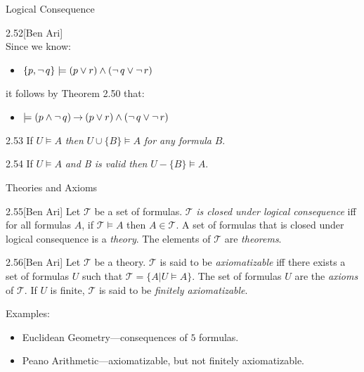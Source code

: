 \begin{wideslide}[bm=,toc=]{Logical Consequence}
\begin{ex}{2.52}[Ben Ari]
~\\Since we know:
\begin{itemize}
\item $\{p,\mathop{\neg} q\} \models (p \lor r) \land (\mathop{\neg} q \lor \mathop{\neg} r)$
\end{itemize}
it follows by Theorem 2.50 that:
\begin{itemize}
\item $\models (p \land \mathop{\neg} q) \mathbin{\rightarrow} (p \lor r) \land (\mathop{\neg} q \lor \mathop{\neg} r)$
\end{itemize}
\end{ex}
\begin{thm}{2.53}
If $U \models A$ \emph{then} $U \cup \{B\} \models A$ \emph{for any formula} $B$. 
\end{thm}
\begin{thm}{2.54}
If $U \models A$ \emph{ and B is valid then} $U - \{B\} \models A$. 
\end{thm}

\end{wideslide}

\begin{wideslide}[bm=,toc=]{Theories and Axioms}
\begin{defn}{2.55}[Ben Ari]
Let $\mathcal{T}$ be a set of formulas. $\mathcal{T}$ \emph{is closed under
logical consequence} iff for all formulas $A$, if $\mathcal{T} \models A$ then
$A \in \mathcal{T}$. A set of formulas that is closed under logical consequence
is a \emph{theory}. The elements of $\mathcal{T}$ are \emph{theorems}.
\end{defn}
\begin{defn}{2.56}[Ben Ari]
Let $\mathcal{T}$ be a theory. $\mathcal{T}$ is said to be \emph{axiomatizable} 
iff there exists a set of formulas $U$ such that  $\mathcal{T} = \{A | U \models
A\}$. The set of formulas $U$ are the \emph{axioms} of $\mathcal{T}$. If $U$ is
finite, $\mathcal{T}$ is said to be \emph{finitely axiomatizable}.
\end{defn}
Examples:
\begin{itemize}
\item Euclidean Geometry---consequences of $5$ formulas.
\item Peano Arithmetic---axiomatizable, but not finitely axiomatizable.
\end{itemize}


\end{wideslide}
